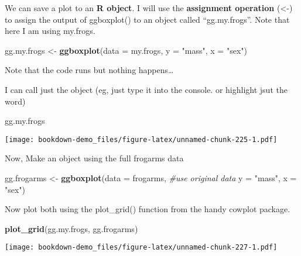 \documentclass[]{book}
\newenvironment{Shaded}{\begin{snugshade}}{\end{snugshade}}
\newcommand{\KeywordTok}[1]{\textcolor[rgb]{0.13,0.29,0.53}{\textbf{#1}}}
\newcommand{\DataTypeTok}[1]{\textcolor[rgb]{0.13,0.29,0.53}{#1}}
\newcommand{\StringTok}[1]{\textcolor[rgb]{0.31,0.60,0.02}{#1}}
\newcommand{\CommentTok}[1]{\textcolor[rgb]{0.56,0.35,0.01}{\textit{#1}}}
\newcommand{\NormalTok}[1]{#1}
\theoremstyle{definition}
\theoremstyle{definition}
\theoremstyle{definition}
\theoremstyle{remark}
\begin{document}
We can save a plot to an \textbf{R object}. I will use the
\textbf{assignment operation} (\textless{}-) to assign the output of
ggboxplot() to an object called ``gg.my.frogs''. Note that here I am
using my.frogs.

\begin{Shaded}
\begin{Highlighting}[]
\NormalTok{gg.my.frogs <-}\StringTok{ }\KeywordTok{ggboxplot}\NormalTok{(}\DataTypeTok{data =}\NormalTok{ my.frogs,}
          \DataTypeTok{y =} \StringTok{"mass"}\NormalTok{,}
          \DataTypeTok{x =} \StringTok{"sex"}\NormalTok{)}
\end{Highlighting}
\end{Shaded}

Note that the code runs but nothing happens\ldots{}

I can call just the object (eg, just type it into the console. or
highlight jsut the word)

\begin{Shaded}
\begin{Highlighting}[]
\NormalTok{gg.my.frogs}
\end{Highlighting}
\end{Shaded}

\texttt{[image: bookdown-demo\_files/figure-latex/unnamed-chunk-225-1.pdf]}

Now, Make an object using the full frogarms data

\begin{Shaded}
\begin{Highlighting}[]
\NormalTok{gg.frogarms <-}\StringTok{ }\KeywordTok{ggboxplot}\NormalTok{(}\DataTypeTok{data =}\NormalTok{ frogarms, }\CommentTok{#use original data}
          \DataTypeTok{y =} \StringTok{"mass"}\NormalTok{,}
          \DataTypeTok{x =} \StringTok{"sex"}\NormalTok{)}
\end{Highlighting}
\end{Shaded}

Now plot both using the plot\_grid() function from the handy cowplot
package.

\begin{Shaded}
\begin{Highlighting}[]
\KeywordTok{plot_grid}\NormalTok{(gg.my.frogs,}
\NormalTok{          gg.frogarms)}
\end{Highlighting}
\end{Shaded}

\texttt{[image: bookdown-demo\_files/figure-latex/unnamed-chunk-227-1.pdf]}
\end{document}

